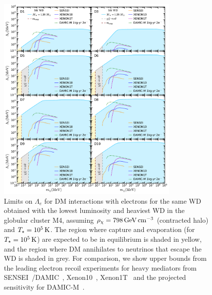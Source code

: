 \begin{figure}[t!bp]
    \centering
    \includegraphics[width=0.8\textwidth]{wd_capture/Lambda_mdm_e_limits.pdf}
    \caption[Limits on $\Lambda_e$ for DM interactions with electrons for the same WD obtained with the lowest luminosity and heaviest WD in the globular cluster M4, assuming $\rho_\chi=798\GeV\cm^{-3}$ (contracted halo) \cite{McCullough:2010ai_CaptureInelasticDark} and $\Tstar=10^5\K$.]{Limits on $\Lambda_e$ for DM interactions with electrons for the same WD obtained with the lowest luminosity and heaviest WD in the globular cluster M4, assuming $\rho_\chi=798\GeV\cm^{-3}$ (contracted halo) \cite{McCullough:2010ai_CaptureInelasticDark} and $\Tstar=10^5\K$. The region where capture and evaporation (for $\Tstar=10^5\K$) are expected to be in equilibrium is shaded in yellow, and the region where DM annihilates to neutrinos that escape the WD is shaded in grey. For comparison, we show upper bounds from the leading electron recoil experiments for heavy mediators from SENSEI~\cite{SENSEI:2020dpa_SENSEIDirectdetectionresults}/DAMIC~\cite{DAMIC:2019dcn_Constraintslightdark}, Xenon10~\cite{Essig:2017kqs_Newconstraintsprospects}, Xenon1T~\cite{XENON:2019gfn_Lightdarkmatter} and the projected sensitivity for DAMIC-M~\cite{Essig:2015cda_DirectdetectionsubGeV}. }
    \label{ch4:fig:Llimitse}
\end{figure}


